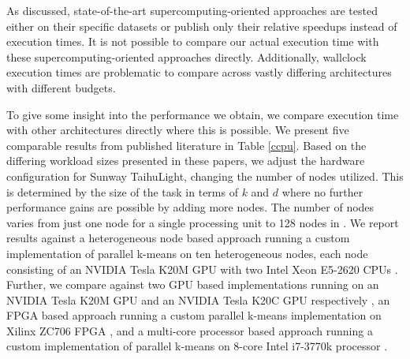 \documentclass[10pt,journal,compsoc]{IEEEtran}
\begin{document}
{\begin{table}
\begin{tabular}{p{2cm} p{3.2cm} p{1cm} p{1cm}p{0.5cm}p{2cm}p{3cm}p{1cm}p{1cm} c c c c c c c }
    \hline
  \end{tabular}
\end{table}

As discussed, state-of-the-art supercomputing-oriented approaches are tested either on their specific datasets \cite{kumar2011parallel,cai2015grouping} or publish only their relative speedups \cite{bender2015k} instead of execution times. It is not possible to compare our actual execution time with these supercomputing-oriented approaches directly. Additionally, wallclock execution times are problematic to compare across vastly differing architectures with different budgets.

To give some insight into the performance we obtain, we compare execution time with other architectures directly where this is possible. We present five comparable results from published literature in Table \ref{ccpu}. Based on the differing workload sizes presented in these papers, we adjust the hardware configuration for Sunway TaihuLight, changing the number of nodes utilized. This is determined by the size of the task in terms of $k$ and $d$ where no further performance gains are possible by adding more nodes. The number of nodes varies from just one node for a single processing unit \cite{jin2018high,li2016high} to 128 nodes in \cite{rossbach2013dandelion}.
We report results against a heterogeneous node based approach running a custom implementation of parallel k-means on ten heterogeneous nodes, each node consisting of an NVIDIA Tesla K20M GPU with two Intel Xeon E5-2620 CPUs \cite{rossbach2013dandelion}. Further, we compare against two GPU based implementations  running on an NVIDIA Tesla K20M GPU and an NVIDIA Tesla K20C GPU respectively \cite{bhimani2015accelerating, jin2018high}, an FPGA based approach running a custom parallel k-means implementation on Xilinx ZC706 FPGA \cite{li2016high}, and a multi-core processor based approach running a custom implementation of parallel k-means on 8-core Intel i7-3770k processor \cite{ding2015yinyang}.

}
\end{document}
